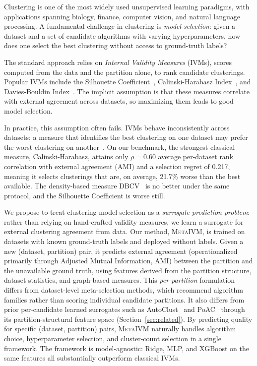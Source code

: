 \documentclass[10pt]{article} %
\newcommand{\ours}{\textsc{MetaIVM}}
\begin{document}
Clustering is one of the most widely used unsupervised learning paradigms, with applications spanning biology, finance, computer vision, and natural language processing. A fundamental challenge in clustering is \emph{model selection}: given a dataset and a set of candidate algorithms with varying hyperparameters, how does one select the best clustering without access to ground-truth labels?

The standard approach relies on \emph{Internal Validity Measures} (IVMs), scores computed from the data and the partition alone, to rank candidate clusterings. Popular IVMs include the Silhouette Coefficient~\citep{rousseeuw1987silhouettes}, Calinski-Harabasz Index~\citep{calinski1974dendrite}, and Davies-Bouldin Index~\citep{davies1979cluster}. The implicit assumption is that these measures correlate with external agreement across datasets, so maximizing them leads to good model selection.

In practice, this assumption often fails. IVMs behave inconsistently across datasets: a measure that identifies the best clustering on one dataset may prefer the worst clustering on another~\citep{simpson2026instance, jeon2025measuring}. On our benchmark, the strongest classical measure, Calinski-Harabasz, attains only $\rho = 0.60$ average per-dataset rank correlation with external agreement (AMI) and a selection regret of 0.217, meaning it selects clusterings that are, on average, 21.7\% worse than the best available. The density-based measure DBCV~\citep{moulavi2014dbcv} is no better under the same protocol, and the Silhouette Coefficient is worse still.

We propose to treat clustering model selection as a \emph{surrogate prediction problem}: rather than relying on hand-crafted validity measures, we learn a surrogate for external clustering agreement from data. Our method, \ours{}, is trained on datasets with known ground-truth labels and deployed without labels. Given a new (dataset, partition) pair, it predicts external agreement (operationalized primarily through Adjusted Mutual Information, AMI) between the partition and the unavailable ground truth, using features derived from the partition structure, dataset statistics, and graph-based measures. This \emph{per-partition} formulation differs from dataset-level meta-selection methods, which recommend algorithm families rather than scoring individual candidate partitions. It also differs from prior per-candidate learned surrogates such as AutoClust~\citep{poulakis2020autoclust} and PoAC~\citep{dasilva2024poac} through its partition-structural feature space (Section~\ref{sec:related}). By predicting quality for specific (dataset, partition) pairs, \ours{} naturally handles algorithm choice, hyperparameter selection, and cluster-count selection in a single framework. The framework is model-agnostic: Ridge, MLP, and XGBoost on the same features all substantially outperform classical IVMs.
\end{document}
